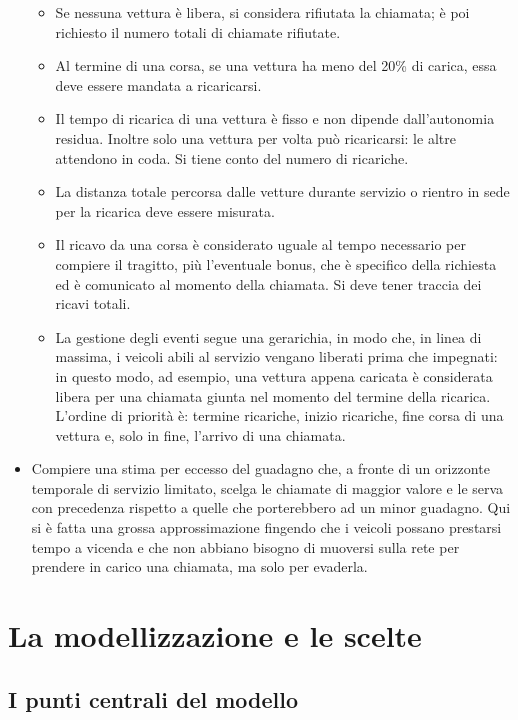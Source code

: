 \documentclass[a4paper,11pt]{Article}
\begin{document}
\begin{itemize}
\begin{itemize}[label=$\ast$]
    \item Se nessuna vettura è libera, si considera rifiutata la chiamata; è poi richiesto il numero totali di chiamate rifiutate.
    \item Al termine di una corsa, se una vettura ha meno del 20\% di carica, essa deve essere mandata a ricaricarsi.
    \item Il tempo di ricarica di una vettura è fisso e non dipende dall'autonomia residua. Inoltre solo una vettura per volta può ricaricarsi: le altre attendono in coda. Si tiene conto del numero di ricariche.
    \item La distanza totale percorsa dalle vetture durante servizio o rientro in sede per la ricarica deve essere misurata.
    \item Il ricavo da una corsa è considerato uguale al tempo necessario per compiere il tragitto, più l'eventuale bonus, che è specifico della richiesta ed è comunicato al momento della chiamata. Si deve tener traccia dei ricavi totali.
    \item La gestione degli eventi segue una gerarichia, in modo che, in linea di massima, i veicoli abili al servizio vengano liberati prima che impegnati: in questo modo, ad esempio, una vettura appena caricata è considerata libera per una chiamata giunta nel momento del termine della ricarica. L'ordine di priorità è: termine ricariche, inizio ricariche, fine corsa di una vettura e, solo in fine, l'arrivo di una chiamata.
  \end{itemize}
\item Compiere una stima per eccesso del guadagno che, a fronte di un orizzonte temporale di servizio limitato, scelga le chiamate di maggior valore e le serva con precedenza rispetto a quelle che porterebbero ad un minor guadagno. Qui si è fatta una grossa approssimazione fingendo che i veicoli possano prestarsi tempo a vicenda e che non abbiano bisogno di muoversi sulla rete per prendere in carico una chiamata, ma solo per evaderla.
\end{itemize}



\section{La modellizzazione e le scelte}
\subsection{I punti centrali del modello}
\end{document}
